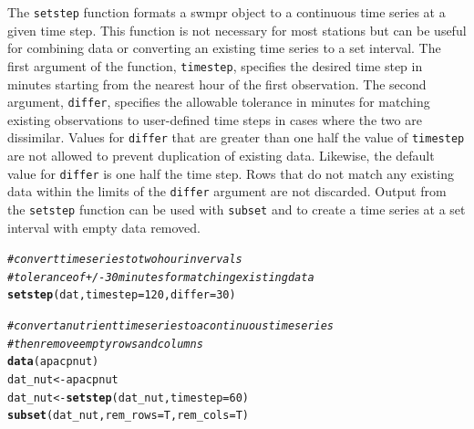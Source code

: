 \documentclass[10pt,letterpaper]{article}\usepackage[]{graphicx}\usepackage[]{color}
\makeatletter
\newcommand{\hlnum}[1]{\textcolor[rgb]{0.686,0.059,0.569}{#1}}%
\newcommand{\hlcom}[1]{\textcolor[rgb]{0.678,0.584,0.686}{\textit{#1}}}%
\newcommand{\hlstd}[1]{\textcolor[rgb]{0.345,0.345,0.345}{#1}}%
\newcommand{\hlkwb}[1]{\textcolor[rgb]{0.69,0.353,0.396}{#1}}%
\newcommand{\hlkwc}[1]{\textcolor[rgb]{0.333,0.667,0.333}{#1}}%
\newcommand{\hlkwd}[1]{\textcolor[rgb]{0.737,0.353,0.396}{\textbf{#1}}}%
\newenvironment{kframe}{%
 \def\at@end@of@kframe{}%
 \ifinner\ifhmode%
  \def\at@end@of@kframe{\end{minipage}}%
  \begin{minipage}{\columnwidth}%
 \fi\fi%
 \def\FrameCommand##1{\hskip\@totalleftmargin \hskip-\fboxsep
 \colorbox{shadecolor}{##1}\hskip-\fboxsep
     \hskip-\linewidth \hskip-\@totalleftmargin \hskip\columnwidth}%
 \MakeFramed {\advance\hsize-\width
   \@totalleftmargin\z@ \linewidth\hsize
   \@setminipage}}%
 {\par\unskip\endMakeFramed%
 \at@end@of@kframe}
\newenvironment{knitrout}{}{} %
\makeatother
\begin{document}
The \texttt{setstep} function formats a swmpr object to a continuous time series at a given time step.  This function is not necessary for most stations but can be useful for combining data or converting an existing time series to a set interval.  The first argument of the function, \texttt{timestep}, specifies the desired time step in minutes starting from the nearest hour of the first observation.  The second argument, \texttt{differ}, specifies the allowable tolerance in minutes for matching existing observations to user-defined time steps in cases where the two are dissimilar.  Values for \texttt{differ} that are greater than one half the value of \texttt{timestep} are not allowed to prevent duplication of existing data.  Likewise, the default value for \texttt{differ} is one half the time step.  Rows that do not match any existing data within the limits of the \texttt{differ} argument are not discarded.  Output from the \texttt{setstep} function can be used with \texttt{subset} and to create a time series at a set interval with empty data removed.

\begin{knitrout}
\color{fgcolor}\begin{kframe}
\begin{alltt}
\hlcom{# convert time series to two hour invervals}
\hlcom{# tolerance of +/- 30 minutes for matching existing data}
\hlkwd{setstep}\hlstd{(dat,} \hlkwc{timestep} \hlstd{=} \hlnum{120}\hlstd{,} \hlkwc{differ} \hlstd{=} \hlnum{30}\hlstd{)}

\hlcom{# convert a nutrient time series to a continuous time series}
\hlcom{# then remove empty rows and columns}
\hlkwd{data}\hlstd{(apacpnut)}
\hlstd{dat_nut} \hlkwb{<-} \hlstd{apacpnut}
\hlstd{dat_nut} \hlkwb{<-} \hlkwd{setstep}\hlstd{(dat_nut,} \hlkwc{timestep} \hlstd{=} \hlnum{60}\hlstd{)}
\hlkwd{subset}\hlstd{(dat_nut,} \hlkwc{rem_rows} \hlstd{= T,} \hlkwc{rem_cols} \hlstd{= T)}
\end{alltt}
\end{kframe}
\end{knitrout}
\end{document}
